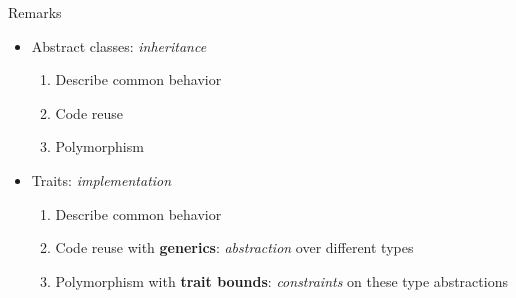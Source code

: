 \begin{frame}[fragile]{Remarks \hfill {\footnotesize \currentname}}


    \begin{itemize}

        \item Abstract classes: \textit{inheritance}
            \begin{enumerate}
                \item Describe common behavior
                \item Code reuse
                \item Polymorphism
            \end{enumerate}

        \item Traits: \textit{implementation}
            \begin{enumerate}
                \item Describe common behavior
                \item Code reuse with \textbf{generics}: \textit{abstraction} over different types
                \item Polymorphism with \textbf{trait bounds}: \textit{constraints} on these type abstractions
            \end{enumerate}

    \end{itemize}

    \vfill

\end{frame}
